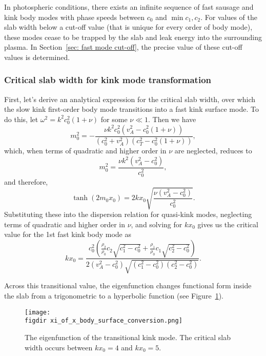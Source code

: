 \documentclass[12pt,draft]{../style-files/ociamthesis}
\begin{document}
In photospheric conditions, there exists an infinite sequence of fast sausage and kink body modes with phase speeds between $c_0$ and $\min{c_1, c_2}$. For values of the slab width below a cut-off value (that is unique for every order of body mode), these modes cease to be trapped by the slab and leak energy into the surrounding plasma. In Section~\ref{sec: fast mode cut-off}, the precise value of these cut-off values is determined.


\subsubsection{Critical slab width for kink mode transformation} \label{sec: critical slab width}
First, let's derive an analytical expression for the critical slab width, over which the slow kink first-order body mode transitions into a fast kink surface mode. To do this, let $\omega^2 = k^2c_0^2(1 + \nu)$ for some $\nu \ll 1$. Then we have
\begin{equation}
m_0^2 = -\frac{\nu k^2c_0^2(v_A^2 - c_0^2(1 + \nu))}{(c_0^2 + v_A^2)(c_T^2 - c_0^2(1 + \nu))},
\end{equation}
which, when terms of quadratic and higher order in $\nu$ are neglected, reduces to
\begin{equation}
m_0^2 = \frac{\nu k^2(v_A^2 - c_0^2)}{c_0^2},
\end{equation}
and therefore,
\begin{equation}
\tanh(2m_0x_0) = 2kx_0\sqrt{\frac{\nu(v_A^2 - c_0^2)}{c_0^2}}.
\end{equation}
Substituting these into the dispersion relation for quasi-kink modes, neglecting terms of quadratic and higher order in $\nu$, and solving for $kx_0$ gives us the critical value for the 1st fast kink body mode as
\begin{equation}
kx_0 = \frac{c_0^2 \left(\frac{\rho_2}{\rho_0}c_2\sqrt{c_1^2 - c_0^2} + \frac{\rho_1}{\rho_0}c_1\sqrt{c_2^2 - c_0^2}\right)}{2(v_A^2 - c_0^2)\sqrt{(c_1^2 - c_0^2)(c_2^2 - c_0^2)}}.
\end{equation}

Across this transitional value, the eigenfunction changes functional form inside the slab from a trigonometric to a hyperbolic function (see Figure~\ref{fig: transitional kink eigenfunction}). 
\begin{figure}
	\centering
	\texttt{[image: \\figdir xi\_of\_x\_body\_surface\_conversion.png]}
	\caption{The eigenfunction of the transitional kink mode. The critical slab width occurs between $kx_0 = 4$ and $kx_0 = 5$.}
	\label{fig: transitional kink eigenfunction}
\end{figure}
\end{document}
